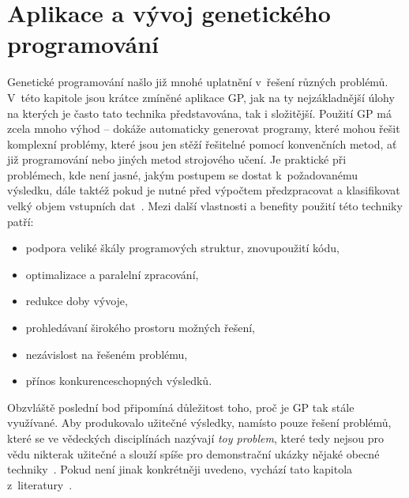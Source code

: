 \chapter{Aplikace a vývoj genetického programování}\label{ch:4}
Genetické programování našlo již mnohé uplatnění v~řešení různých problémů. V~této kapitole jsou krátce zmíněné aplikace GP, jak na ty nejzákladnější úlohy na kterých je často tato technika představována, tak i  složitější. Použití GP má zcela mnoho výhod -- dokáže automaticky generovat programy, které mohou řešit komplexní problémy, které jsou jen stěží řešitelné pomocí konvenčních metod, ať již programování nebo jiných metod strojového učení. Je praktické při problémech, kde není jasné, jakým postupem se dostat k~požadovanému výsledku, dále taktéž pokud je nutné před výpočtem předzpracovat a klasifikovat velký objem vstupních dat~\cite{Koza:2010:GPEM}. Mezi další vlastnosti a benefity použití této techniky patří:
\begin{itemize}
    \setlength\itemsep{0.01em}
    \item podpora veliké škály programových struktur, znovupoužití kódu,
    \item optimalizace a paralelní zpracování,
    \item redukce doby vývoje,
    \item prohledávaní širokého prostoru možných řešení,
    \item nezávislost na řešeném problému,
    \item přínos konkurenceschopných výsledků.
\end{itemize}
\noindent Obzvláště poslední bod připomíná důležitost toho, proč je GP tak stále využívané. Aby produkovalo užitečné výsledky, namísto pouze řešení problémů, které se ve vědeckých disciplínách nazývají \emph{toy problem}, které tedy nejsou pro vědu nikterak užitečné a slouží spíše pro demonstrační ukázky nějaké obecné techniky~\cite{gptrends}. Pokud není jinak konkrétněji uvedeno, vychází tato kapitola z~literatury~\cite{Brameier1998, Koza:2010:GPEM}.

